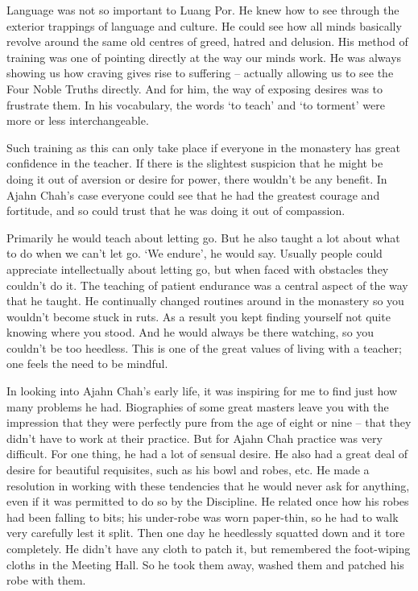 Language was not so important to Luang Por. He knew how to see through
the exterior trappings of language and culture. He could see how all
minds basically revolve around the same old centres of greed, hatred and
delusion. His method of training was one of pointing directly at the way
our minds work. He was always showing us how craving gives rise to
suffering -- actually allowing us to see the Four Noble Truths directly.
And for him, the way of exposing desires was to frustrate them. In his
vocabulary, the words `to teach' and `to torment' were more or less
interchangeable.

Such training as this can only take place if everyone in the monastery
has great confidence in the teacher. If there is the slightest suspicion
that he might be doing it out of aversion or desire for power, there
wouldn't be any benefit. In Ajahn Chah's case everyone could see that he
had the greatest courage and fortitude, and so could trust that he was
doing it out of compassion.

Primarily he would teach about letting go. But he also taught a lot
about what to do when we can't let go. `We endure', he would say.
Usually people could appreciate intellectually about letting go, but
when faced with obstacles they couldn't do it. The teaching of patient
endurance was a central aspect of the way that he taught. He continually
changed routines around in the monastery so you wouldn't become stuck in
ruts. As a result you kept finding yourself not quite knowing where you
stood. And he would always be there watching, so you couldn't be too
heedless. This is one of the great values of living with a teacher; one
feels the need to be mindful.

In looking into Ajahn Chah's early life, it was inspiring for me to find
just how many problems he had. Biographies of some great masters leave
you with the impression that they were perfectly pure from the age
of eight or nine -- that they didn't have to work at their practice. But
for Ajahn Chah practice was very difficult. For one thing, he had a lot
of sensual desire. He also had a great deal of desire for beautiful
requisites, such as his bowl and robes, etc. He made a resolution in
working with these tendencies that he would never ask for anything, even
if it was permitted to do so by the Discipline. He related once how his
robes had been falling to bits; his under-robe was worn paper-thin, so
he had to walk very carefully lest it split. Then one day he heedlessly
squatted down and it tore completely. He didn't have any cloth to patch
it, but remembered the foot-wiping cloths in the Meeting Hall. So he
took them away, washed them and patched his robe with them.

